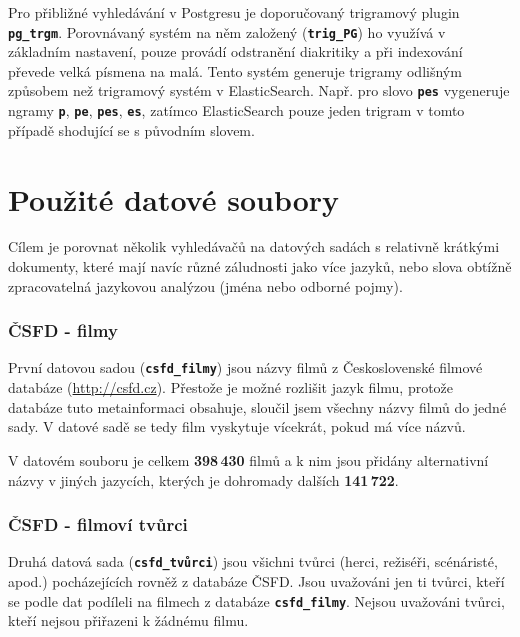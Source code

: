 \documentclass[11pt,letterpaper,oneside,openright]{book}
\newcommand{\bftt}[1]{\texttt{\textbf{#1}}}
\begin{document}
Pro přibližné vyhledávání v Postgresu je doporučovaný trigramový plugin
\bftt{pg\_trgm}. Porovnávaný systém na něm založený (\bftt{trig\_PG}) ho
využívá v základním nastavení, pouze provádí odstranění diakritiky a při
indexování převede velká písmena na malá. Tento systém generuje trigramy
odlišným způsobem než trigramový systém v ElasticSearch. Např. pro slovo
\bftt{pes} vygeneruje ngramy \bftt{p}, \bftt{pe}, \bftt{pes}, \bftt{es},
zatímco ElasticSearch pouze jeden trigram v tomto případě shodující se s
původním slovem.





\section{Použité datové soubory}
Cílem je porovnat několik vyhledávačů na datových sadách s relativně krátkými
dokumenty, které mají navíc různé záludnosti jako více jazyků, nebo slova
obtížně zpracovatelná jazykovou analýzou (jména nebo odborné pojmy).

\subsubsection{ČSFD - filmy}
První datovou sadou (\bftt{csfd\_filmy}) jsou názvy filmů z Československé
filmové databáze (\url{http://csfd.cz}). Přestože je možné rozlišit jazyk
filmu, protože databáze tuto metainformaci obsahuje, sloučil jsem všechny názvy
filmů do jedné sady. V datové sadě se tedy film vyskytuje vícekrát, pokud má
více názvů.

V datovém souboru je celkem \textbf{398\,430} filmů a k nim jsou přidány
alternativní názvy v jiných jazycích, kterých je dohromady dalších
\textbf{141\,722}.

\subsubsection{ČSFD - filmoví tvůrci}
Druhá datová sada (\bftt{csfd\_tvůrci}) jsou všichni tvůrci (herci, režiséři,
scénáristé, apod.) pocházejících rovněž z databáze ČSFD. Jsou uvažováni jen ti
tvůrci, kteří se podle dat podíleli na filmech z databáze \bftt{csfd\_filmy}.
Nejsou uvažováni tvůrci, kteří nejsou přiřazeni k žádnému filmu.
\end{document}
